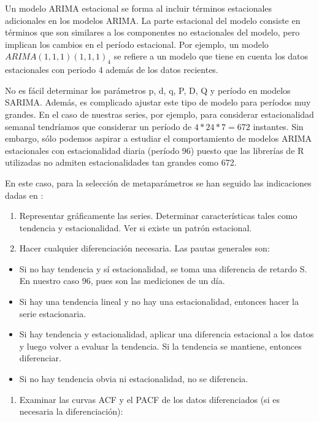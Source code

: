 \documentclass[]{book}
\providecommand{\tightlist}{%
  \setlength{\itemsep}{0pt}\setlength{\parskip}{0pt}}
\begin{document}
Un modelo ARIMA estacional se forma al incluir términos estacionales
adicionales en los modelos ARIMA. La parte estacional del modelo
consiste en términos que son similares a los componentes no estacionales
del modelo, pero implican los cambios en el período estacional. Por
ejemplo, un modelo \(ARIMA(1,1,1)(1,1,1)_4\) se refiere a un modelo que
tiene en cuenta los datos estacionales con periodo 4 además de los datos
recientes.

No es fácil determinar los parámetros p, d, q, P, D, Q y período en
modelos SARIMA. Además, es complicado ajustar este tipo de modelo para
períodos muy grandes. En el caso de nuestras series, por ejemplo, para
considerar estacionalidad semanal tendríamos que considerar un período
de \(4*24*7 = 672\) instantes. Sin embargo, sólo podemos aspirar a
estudiar el comportamiento de modelos ARIMA estacionales con
estacionalidad diaria (período 96) puesto que las librerías de R
utilizadas no admiten estacionalidades tan grandes como 672.

En este caso, para la selección de metaparámetros se han seguido las
indicaciones dadas en \citep{41Season30-online}:

\begin{enumerate}
\def\labelenumi{\arabic{enumi}.}
\item
  Representar gráficamente las series. Determinar características tales
  como tendencia y estacionalidad. Ver si existe un patrón estacional.
\item
  Hacer cualquier diferenciación necesaria. Las pautas generales son:
\end{enumerate}

\begin{itemize}
\tightlist
\item
  Si no hay tendencia y sí estacionalidad, se toma una diferencia de
  retardo S. En nuestro caso 96, pues son las mediciones de un día.
\item
  Si hay una tendencia lineal y no hay una estacionalidad, entonces
  hacer la serie estacionaria.
\item
  Si hay tendencia y estacionalidad, aplicar una diferencia estacional a
  los datos y luego volver a evaluar la tendencia. Si la tendencia se
  mantiene, entonces diferenciar.
\item
  Si no hay tendencia obvia ni estacionalidad, no se diferencia.
\end{itemize}

\begin{enumerate}
\def\labelenumi{\arabic{enumi}.}
\setcounter{enumi}{2}
\tightlist
\item
  Examinar las curvas ACF y el PACF de los datos diferenciados (si es
  necesaria la diferenciación):
\end{enumerate}
\end{document}

